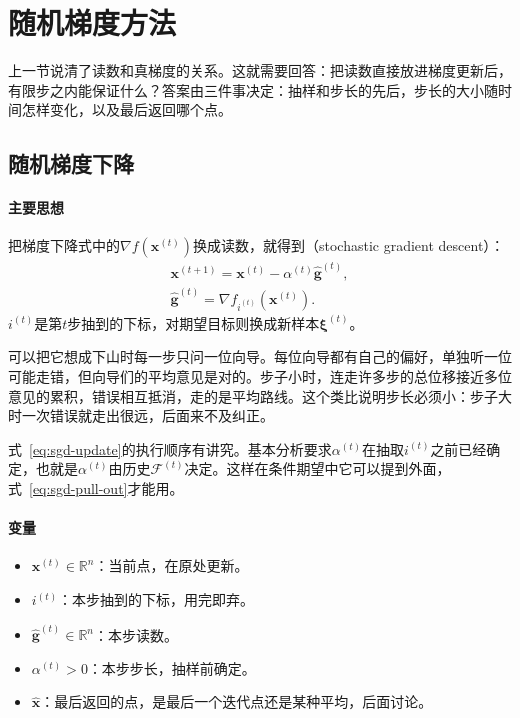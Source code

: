 \section{随机梯度方法}
\label{sec:sgd-method}

上一节说清了读数和真梯度的关系。这就需要回答：把读数直接放进梯度更新后，有限步之内能保证什么？答案由三件事决定：抽样和步长的先后，步长的大小随时间怎样变化，以及最后返回哪个点。

\subsection{随机梯度下降}
\label{sec:sgd-basic}

\paragraph{主要思想}
把梯度下降式中的$\nabla f(\bm{x}^{(t)})$换成读数，就得到（stochastic gradient descent）：
\begin{equation}
 \begin{gathered}
 \bm{x}^{(t+1)}=\bm{x}^{(t)}-\alpha^{(t)}\hat{\bm{g}}^{(t)},\\
 \hat{\bm{g}}^{(t)}=\nabla f_{i^{(t)}}(\bm{x}^{(t)}).
 \end{gathered}
 \label{eq:sgd-update}
\end{equation}
$i^{(t)}$是第$t$步抽到的下标，对期望目标则换成新样本$\bm{\xi}^{(t)}$。

可以把它想成下山时每一步只问一位向导。每位向导都有自己的偏好，单独听一位可能走错，但向导们的平均意见是对的。步子小时，连走许多步的总位移接近多位意见的累积，错误相互抵消，走的是平均路线。这个类比说明步长必须小：步子大时一次错误就走出很远，后面来不及纠正。

式~\eqref{eq:sgd-update}的执行顺序有讲究。基本分析要求$\alpha^{(t)}$在抽取$i^{(t)}$之前已经确定，也就是$\alpha^{(t)}$由历史$\mathcal{F}^{(t)}$决定。这样在条件期望中它可以提到外面，式~\eqref{eq:sgd-pull-out}才能用。

\paragraph{变量}
\begin{itemize}
 \item $\bm{x}^{(t)}\in\mathbb{R}^n$：当前点，在原处更新。
 \item $i^{(t)}$：本步抽到的下标，用完即弃。
 \item $\hat{\bm{g}}^{(t)}\in\mathbb{R}^n$：本步读数。
 \item $\alpha^{(t)}>0$：本步步长，抽样前确定。
 \item $\hat{\bm{x}}$：最后返回的点，是最后一个迭代点还是某种平均，后面讨论。
\end{itemize}

